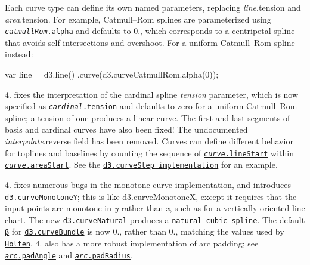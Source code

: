   

Each curve type can define its own named parameters, replacing {\itshape line}.tension and {\itshape area}.tension. For example, Catmull–\+Rom splines are parameterized using \href{https://github.com/d3/d3-shape/blob/master/README.md#curveCatmullRom_alpha}{\tt {\itshape catmull\+Rom}.alpha} and defaults to 0., which corresponds to a centripetal spline that avoids self-\/intersections and overshoot. For a uniform Catmull–\+Rom spline instead\+:


\begin{DoxyCode}
var line = d3.line()
    .curve(d3.curveCatmullRom.alpha(0));
\end{DoxyCode}


4. fixes the interpretation of the cardinal spline {\itshape tension} parameter, which is now specified as \href{https://github.com/d3/d3-shape/blob/master/README.md#curveCardinal_tension}{\tt {\itshape cardinal}.tension} and defaults to zero for a uniform Catmull–\+Rom spline; a tension of one produces a linear curve. The first and last segments of basis and cardinal curves have also been fixed! The undocumented {\itshape interpolate}.reverse field has been removed. Curves can define different behavior for toplines and baselines by counting the sequence of \href{https://github.com/d3/d3-shape/blob/master/README.md#curve_lineStart}{\tt {\itshape curve}.line\+Start} within \href{https://github.com/d3/d3-shape/blob/master/README.md#curve_areaStart}{\tt {\itshape curve}.area\+Start}. See the \href{https://github.com/d3/d3-shape/blob/master/src/curve/step.js}{\tt d3.\+curve\+Step implementation} for an example.

4. fixes numerous bugs in the monotone curve implementation, and introduces \href{https://github.com/d3/d3-shape/blob/master/README.md#curveMonotoneY}{\tt d3.\+curve\+MonotoneY}; this is like d3.\+curve\+MonotoneX, except it requires that the input points are monotone in {\itshape y} rather than {\itshape x}, such as for a vertically-\/oriented line chart. The new \href{https://github.com/d3/d3-shape/blob/master/README.md#curveNatural}{\tt d3.\+curve\+Natural} produces a \href{http://mathworld.wolfram.com/CubicSpline.html}{\tt natural cubic spline}. The default \href{https://github.com/d3/d3-shape/blob/master/README.md#bundle_beta}{\tt β} for \href{https://github.com/d3/d3-shape/blob/master/README.md#curveBundle}{\tt d3.\+curve\+Bundle} is now 0., rather than 0., matching the values used by \href{https://www.win.tue.nl/vis1/home/dholten/papers/bundles_infovis.pdf}{\tt Holten}. 4. also has a more robust implementation of arc padding; see \href{https://github.com/d3/d3-shape/blob/master/README.md#arc_padAngle}{\tt {\itshape arc}.pad\+Angle} and \href{https://github.com/d3/d3-shape/blob/master/README.md#arc_padRadius}{\tt {\itshape arc}.pad\+Radius}.

